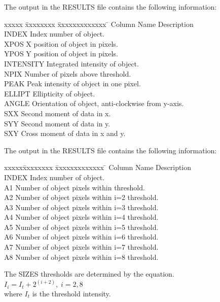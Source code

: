{{{         \sstitem
         The output in the RESULTS file contains the following
         information:
\begin{tabbing}
xxxxx \= xxxxxxxx \= xxxxxxxxxxxxx \= \kill
\> Column \> Name  \> Description \\
 \> INDEX \> Index number of object.\\
 \> XPOS \> X position of object in pixels.\\
 \> YPOS \> Y position of object in pixels.\\
 \> INTENSITY \> Integrated intensity of object.\\
 \> NPIX \> Number of pixels above threshold.\\
 \> PEAK \> Peak intensity of object in one pixel.\\
 \> ELLIPT \> Ellipticity of object.\\
 \> ANGLE \> Orientation of object, anti-clockwise from y-axis.\\
 \> SXX \> Second moment of data in x.\\
 \> SYY \> Second moment of data in y.\\
 \> SXY \> Cross moment of data in x and y.\\
\end{tabbing}

         \sstitem
         The output in the RESULTS file contains the following
         information:
\begin{tabbing}
xxxxx\=xxxxxxxx \= xxxxxxxxxxxxx \= \kill
\>Column \> Name  \> Description \\
 \> INDEX \> Index number of object.\\
 \> A1 \> Number of object pixels within threshold.\\
 \> A2 \> Number of object pixels within i=2 threshold.\\
 \> A3 \> Number of object pixels within i=3 threshold.\\
 \> A4 \> Number of object pixels within i=4 threshold.\\
 \> A5 \> Number of object pixels within i=5 threshold.\\
 \> A6 \> Number of object pixels within i=6 threshold.\\
 \> A7 \> Number of object pixels within i=7 threshold.\\
 \> A8 \> Number of object pixels within i=8 threshold.\\
\end{tabbing}

      The SIZES thresholds are determined by the equation. \\
      \begin{math}
         I_{i} = I_{t} + 2^{(i+2)},\; i=2,8
      \end{math} \\
      where $I_{t}$ is the threshold intensity.

      }
   }
}
